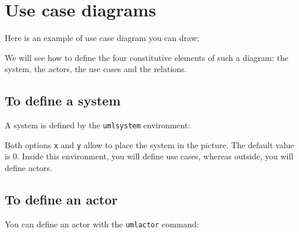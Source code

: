 \documentclass[a4paper,11pt]{report}
\begin{document}
\chapter{Use case diagrams}\label{c.usecase}

Here is an example of use case diagram you can draw:

\begin{center}
\end{center}

We will see how to define the four constitutive elements of such a diagram: the system, the actors, the use cases and the relations.

\section{To define a system}\label{s.system}

A system is defined by the {\tt umlsystem} environment:

\medskip

\begin{minipage}{0.6\textwidth}
	
\end{minipage}
\begin{minipage}{0.4\textwidth}
	\begin{center}
	\end{center}
\end{minipage}

\medskip

Both options {\tt x} and {\tt y} allow to place the system in the picture. The default value is 0. Inside this environment, you will define use cases, whereas outside, you will define actors.

\section{To define an actor}\label{s.actor}

You can define an actor with the {\tt umlactor} command:

\medskip

\begin{minipage}{0.6\textwidth}
	
\end{minipage}
\begin{minipage}{0.4\textwidth}
	\begin{center}
	\end{center}
\end{minipage}
\end{document}
